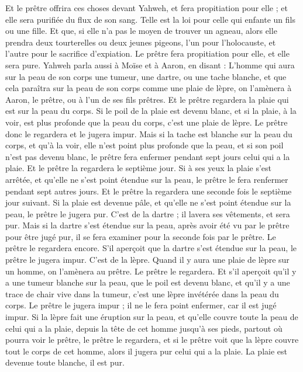 \begin{multicols}{2}
Et le prêtre offrira ces choses devant Yahweh, et fera propitiation pour elle ; et elle sera purifiée du flux de son sang. Telle est la loi pour celle qui enfante un fils ou une fille.
Et que, si elle n'a pas le moyen de trouver un agneau, alors elle prendra deux tourterelles ou deux jeunes pigeons, l'un pour l'holocauste, et l'autre pour le sacrifice d'expiation. Le prêtre fera propitiation pour elle, et elle sera pure.
\VerseOne{}Yahweh parla aussi à Moïse et à Aaron, en disant :
L'homme qui aura sur la peau de son corps une tumeur, une dartre, ou une tache blanche, et que cela paraîtra sur la peau de son corps comme une plaie de lèpre, on l'amènera à Aaron, le prêtre, ou à l'un de ses fils prêtres.
Et le prêtre regardera la plaie qui est sur la peau du corps. Si le poil de la plaie est devenu blanc, et si la plaie, à la voir, est plus profonde que la peau du corps, c'est une plaie de lèpre. Le prêtre donc le regardera et le jugera impur.
Mais si la tache est blanche sur la peau du corps, et qu'à la voir, elle n'est point plus profonde que la peau, et si son poil n'est pas devenu blanc, le prêtre fera enfermer pendant sept jours celui qui a la plaie.
Et le prêtre la regardera le septième jour. Si à ses yeux la plaie s'est arrêtée, et qu'elle ne s'est point étendue sur la peau, le prêtre le fera renfermer pendant sept autres jours.
Et le prêtre la regardera une seconde fois le septième jour suivant. Si la plaie est devenue pâle, et qu'elle ne s'est point étendue sur la peau, le prêtre le jugera pur. C'est de la dartre ; il lavera ses vêtements, et sera pur.
Mais si la dartre s'est étendue sur la peau, après avoir été vu par le prêtre pour être jugé pur, il se fera examiner pour la seconde fois par le prêtre.
Le prêtre le regardera encore. S'il aperçoit que la dartre s'est étendue sur la peau, le prêtre le jugera impur. C'est de la lèpre.
Quand il y aura une plaie de lèpre sur un homme, on l'amènera au prêtre.
Le prêtre le regardera. Et s'il aperçoit qu'il y a une tumeur blanche sur la peau, que le poil est devenu blanc, et qu'il y a une trace de chair vive dans la tumeur,
c'est une lèpre invétérée dans la peau du corps. Le prêtre le jugera impur ; il ne le fera point enfermer, car il est jugé impur.
Si la lèpre fait une éruption sur la peau, et qu'elle couvre toute la peau de celui qui a la plaie, depuis la tête de cet homme jusqu'à ses pieds, partout où pourra voir le prêtre, le prêtre le regardera,
et si le prêtre voit que la lèpre couvre tout le corps de cet homme, alors il jugera pur celui qui a la plaie. La plaie est devenue toute blanche, il est pur.

\end{multicols}
